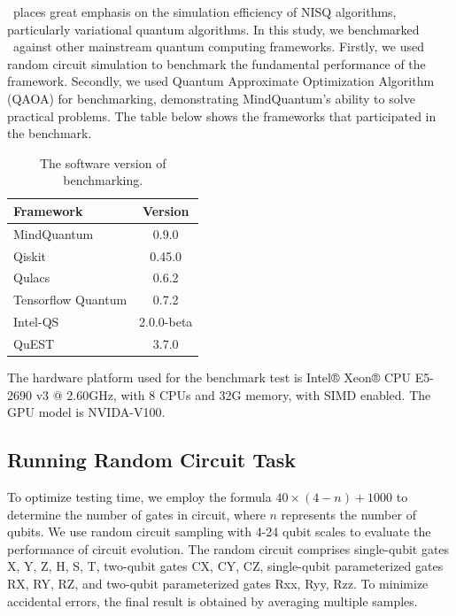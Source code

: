 \MindQuantum\ places great emphasis on the simulation efficiency of NISQ algorithms, particularly variational quantum algorithms. In this study, we benchmarked \MindQuantum\ against other mainstream quantum computing frameworks. Firstly, we used random circuit simulation to benchmark the fundamental performance of the framework. Secondly, we used Quantum Approximate Optimization Algorithm (QAOA) for benchmarking, demonstrating MindQuantum’s ability to solve practical problems. The table below shows the frameworks that participated in the benchmark.

\begin{table}[h!]\centering
\begin{minipage}{\columnwidth}
        \begin{tabularx}{0.9\textwidth}{X c}\toprule
            \textbf{Framework} & \textbf{Version}\\
            \hline
            MindQuantum & 0.9.0\\
            Qiskit & 0.45.0\\
            Qulacs & 0.6.2\\
            Tensorflow Quantum & 0.7.2\\
            Intel-QS & 2.0.0-beta\\
            QuEST & 3.7.0\\
            \bottomrule
        \end{tabularx}
    \caption{The software version of benchmarking.}\label{software version}
\end{minipage}
\end{table}

The hardware platform used for the benchmark test is Intel® Xeon® CPU E5-2690 v3 @ 2.60GHz, with 8 CPUs and 32G memory, with SIMD enabled. The GPU model is NVIDA-V100.

\subsection{Running Random Circuit Task}

To optimize testing time, we employ the formula $40 \times (4−n)+1000$ to determine the number of gates in circuit, where $n$ represents the number of qubits. We use random circuit sampling with 4-24 qubit scales to evaluate the performance of circuit evolution. The random circuit comprises single-qubit gates X, Y, Z, H, S, T, two-qubit gates CX, CY, CZ, single-qubit parameterized gates RX, RY, RZ, and two-qubit parameterized gates Rxx, Ryy, Rzz. To minimize accidental errors, the final result is obtained by averaging multiple samples.

